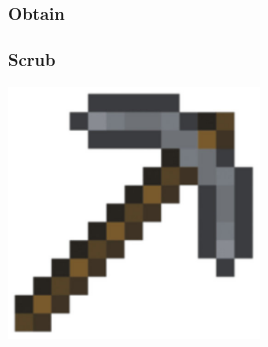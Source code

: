 \documentclass[xcolor=dvipsnames, 9pt]{beamer}
\begin{document}
{
\begin{frame}
    \frametitle{Obtain}
\end{frame}
}

\begin{frame}
    \frametitle{Scrub}
    \begin{center}
    \includegraphics[width=0.5\textwidth]{pickaxe.png}
    \end{center}
\end{frame}
\end{document}

